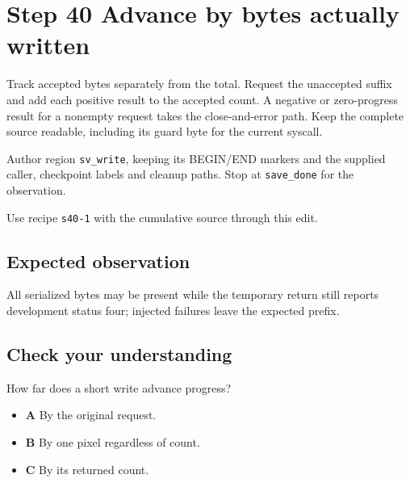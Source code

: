 \section{Step 40 Advance by bytes actually written}\label{ppm-s40}

Track accepted bytes separately from the total. Request the unaccepted suffix and add each positive result to the accepted count. A negative or zero-progress result for a nonempty request takes the close-and-error path. Keep the complete source readable, including its guard byte for the current syscall.

Author region \texttt{sv\_write}, keeping its BEGIN/END markers and the supplied caller, checkpoint labels and cleanup paths. Stop at \texttt{save\_done} for the observation.

Use recipe \texttt{s40-1} with the cumulative source through this edit.

\subsection{Expected observation}
All serialized bytes may be present while the temporary return still reports development status four; injected failures leave the expected prefix.

\subsection{Check your understanding}
How far does a short write advance progress?

\begin{itemize}
\item \textbf{A} By the original request.
\item \textbf{B} By one pixel regardless of count.
\item \textbf{C} By its returned count.
\end{itemize}
